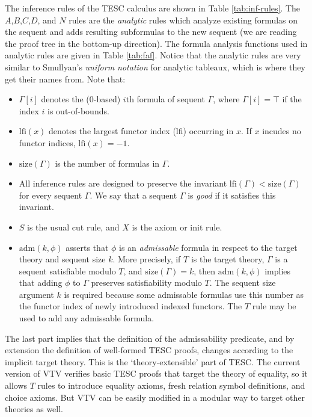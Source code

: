 \documentclass[12pt]{article}
\newcommand{\lfi}[0]{\mathrm{lfi}}
\newcommand{\size}[0]{\mathrm{size}}
\newcommand{\adm}[0]{\mathrm{adm}}
\begin{document}
The inference rules of the TESC calculus are shown in Table \ref{tab:inf-rules}.
The $A$,$B$,$C$,$D$, and $N$ rules are the \textit{analytic} rules which analyze  
existing formulas on the sequent and adds resulting subformulas to the new 
sequent (we are reading the proof tree in the bottom-up direction).
The formula analysis functions used in analytic rules are given in Table 
\ref{tab:faf}. Notice that the analytic rules are very similar to 
Smullyan's \textit{uniform notation} for analytic tableaux, which is where 
they get their names from. Note that: 
\begin{itemize}
  \item $\Gamma[i]$ denotes the (0-based) $i$th formula of sequent $\Gamma$, 
    where $\Gamma[i] = \top$ if the index $i$ is out-of-bounds. 
  \item $\lfi(x)$ denotes the largest functor index (lfi) occurring in $x$. 
    If $x$ incudes no functor indices, $\lfi(x) = -1$.
  \item $\size(\Gamma)$ is the number of formulas in $\Gamma$.
  \item All inference rules are designed to preserve the invariant
    $\lfi(\Gamma) < \size(\Gamma)$ for every sequent $\Gamma$. We say that 
    a sequent $\Gamma$ is \textit{good} if it satisfies this invariant.
  \item $S$ is the usual cut rule, and $X$ is the axiom or init rule. 
  \item $\adm(k,\phi)$ asserts that $\phi$ is an \textit{admissable} formula in 
    respect to the target theory and sequent size $k$. More precisely, if $T$ 
    is the target theory, $\Gamma$ is a sequent satisfiable modulo $T$, and 
    $\size(\Gamma) = k$, then $\adm(k,\phi)$ implies that adding $\phi$ to 
    $\Gamma$ preserves satisfiability modulo $T$. The sequent size argument $k$ 
    is required because some admissable formulas use this number as the functor 
    index of newly introduced indexed functors. The $T$ rule may be used to add 
    any admissable formula.
\end{itemize}
The last part implies that the definition of the admissability predicate, and by 
extension the definition of well-formed TESC proofs, changes according to the implicit 
target theory. This is the `theory-extensible' part of TESC. The current version of 
VTV verifies basic TESC proofs that target the theory of equality, so it allows $T$ 
rules to introduce equality axioms, fresh relation symbol definitions, and choice axioms.
But VTV can be easily modified in a modular way to target other theories as well.
\end{document}
